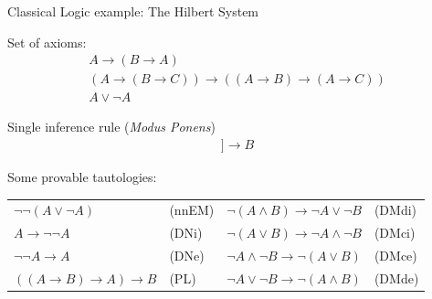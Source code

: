 \documentclass[aspectratio=169, 12pt, fleqn]{beamer}
\begin{document}
\begin{frame}{Classical Logic}
{example: The Hilbert System}

\textcolor{dkblue}{Set of axioms:}
\begin{gather}
A \rightarrow (B \rightarrow A)
\tag{A1} \\
(A \rightarrow (B \rightarrow C)) \rightarrow ((A \rightarrow B) \rightarrow (A \rightarrow C))
\tag{A2} \\
A \lor \neg A
\tag{EM} 
\end{gather}

\textcolor{dkblue}{Single inference rule (\textit{Modus Ponens})}
\begin{gather} 
[\![ A, A \rightarrow B ]\!] \longrightarrow B
\tag{MP}
\end{gather}

\textcolor{dkblue}{Some provable tautologies:}
\begin{tabular}{p{.32\linewidth}p{.17\linewidth} p{.32\linewidth}p{.18\linewidth}}
$\neg \neg (A \lor \neg A)$ & (nnEM) & $\neg (A \land B) \rightarrow \neg A \lor \neg B $ & (DMdi) \\
$A \rightarrow \neg \neg A$ & (DNi)  & $\neg (A \lor B) \rightarrow \neg A \land \neg B $ & (DMci) \\
$\neg \neg A \rightarrow A$ & (DNe)  & $\neg A \land \neg B \rightarrow  \neg (A \lor B) $ & (DMce) \\
$((A \rightarrow B) \rightarrow A) \rightarrow B$ & (PL) & $\neg A \lor \neg B \rightarrow  \neg (A \land B) $ & (DMde)
\end{tabular}

\end{frame}
\end{document}
